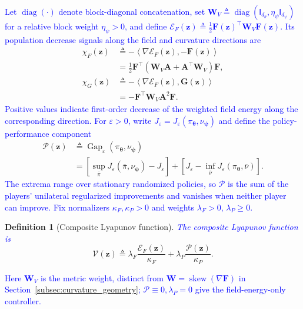 \documentclass[journal]{IEEEtran}
\newtheorem{definition}{Definition}
\theoremstyle{remark}
\newcommand{\inner}[2]{\left\langle #1,#2\right\rangle}
\newcommand{\Id}{\mathsf{I}}
\newcommand{\diag}{\operatorname{diag}}
\newcommand{\skewop}{\operatorname{skew}}
\newcommand{\bz}{\boldsymbol{z}}
\newcommand{\btheta}{\boldsymbol{\theta}}
\newcommand{\bpsi}{\boldsymbol{\psi}}
\newcommand{\bW}{\boldsymbol{W}}
\newcommand{\bA}{\boldsymbol{A}}
\newcommand{\bF}{\boldsymbol{F}}
\newcommand{\bG}{\boldsymbol{G}}
\newcommand{\Vk}{\mathcal{V}}
\newcommand{\cE}{\mathcal{E}}
\newcommand{\cP}{\mathcal{P}}
\begin{document}
	\textcolor{blue}{Let $\diag(\cdot)$ denote block-diagonal concatenation, set $\bW_{V}\triangleq\diag(\Id_{d_{\theta}},\eta_{\psi}\Id_{d_{\psi}})$ for a relative block weight $\eta_{\psi}>0$, and define $\cE_{F}(\bz)\triangleq\tfrac12\bF(\bz)^{\top}\bW_{V}\bF(\bz)$.}
	\textcolor{blue}{Its population decrease signals along the field and curvature directions are}
	\begin{equation}\label{eq:geometry_signals}
		\begin{aligned}
			\chi_F(\bz)
			&\triangleq-\inner{\nabla\cE_F(\bz)}{-\bF(\bz)}\\
			&=\tfrac12\bF^\top(\bW_V\bA+\bA^\top\bW_V)\bF,\\
			\chi_G(\bz)
			&\triangleq-\inner{\nabla\cE_F(\bz)}{\bG(\bz)}\\
			&=-\bF^\top\bW_V\bA^2\bF.
		\end{aligned}
	\end{equation}
	\textcolor{blue}{Positive values indicate first-order decrease of the weighted field energy along the corresponding direction.}
	\textcolor{blue}{For $\varepsilon>0$, write $J_\varepsilon=J_\varepsilon(\pi_{\btheta},\nu_{\bpsi})$ and define the policy-performance component}
	\[
	\begin{aligned}
		\cP(\bz)
		&\triangleq\operatorname{Gap}_{\varepsilon}(\pi_{\btheta},\nu_{\bpsi})\\
		&=\left[\sup_{\bar\pi}J_{\varepsilon}(\bar\pi,\nu_{\bpsi})-J_\varepsilon\right]
		+\left[J_\varepsilon-\inf_{\bar\nu}J_{\varepsilon}(\pi_{\btheta},\bar\nu)\right].
	\end{aligned}
	\]
	\textcolor{blue}{The extrema range over stationary randomized policies, so $\cP$ is the sum of the players' unilateral regularized improvements and vanishes when neither player can improve.}
	\textcolor{blue}{Fix normalizers $\kappa_{F},\kappa_{P}>0$ and weights $\lambda_{F}>0$, $\lambda_{P}\ge0$.}
	\begin{definition}[Composite Lyapunov function]\label{def:Lyap}
		\textcolor{blue}{The composite Lyapunov function is}
		\begin{equation}\label{eq:Vdef}
			\Vk(\bz)
			\triangleq
			\lambda_{F}\frac{\cE_{F}(\bz)}{\kappa_{F}}
			+
			\lambda_{P}\frac{\cP(\bz)}{\kappa_{P}}.
		\end{equation}
	\end{definition}
	\textcolor{blue}{Here $\bW_V$ is the metric weight, distinct from $\bW=\skewop(\nabla\bF)$ in Section~\ref{subsec:curvature_geometry}; $\cP\equiv0,\lambda_P=0$ give the field-energy-only controller.}
	
\end{document}
